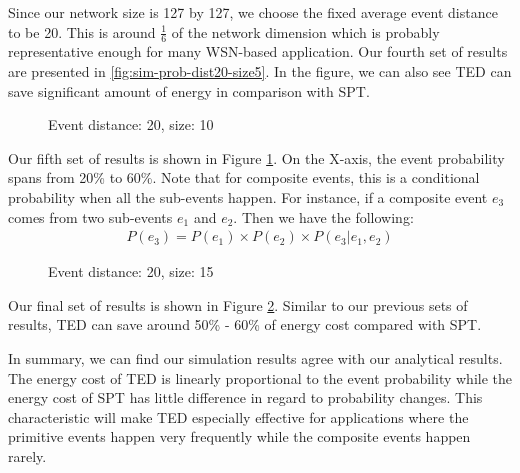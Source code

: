 Since our network size is 127 by 127, we choose the fixed average event distance to be 20. This is around \(\frac{1}{6}\) of the network dimension which is probably representative enough for many WSN-based application. Our fourth set of results are presented in \ref{fig:sim-prob-dist20-size5}. In the figure, we can also see TED can save significant amount of energy in comparison with SPT.

\begin{figure}
\centering
{}
\caption{Event distance: 20, size: 10}
\label{fig:sim-prob-dist20-size10}
\end{figure}

Our fifth set of results is shown in Figure \ref{fig:sim-prob-dist20-size10}. On the X-axis, the event probability spans from 20\% to 60\%. Note that for composite events, this is a conditional probability when all the sub-events happen. For instance, if a composite event \(e_3\) comes from two sub-events \(e_1\) and \(e_2\). Then we have the following:
\begin{align*}
P(e_3) = P(e_1) \times P(e_2) \times P(e_3|e_1, e_2)
\end{align*}

\begin{figure}
\centering
{}
\caption{Event distance: 20, size: 15}
\label{fig:sim-prob-dist20-size15}
\end{figure}

Our final set of results is shown in Figure \ref{fig:sim-prob-dist20-size15}. Similar to our previous sets of results, TED can save around 50\% - 60\% of energy cost compared with SPT.

In summary, we can find our simulation results agree with our analytical results. The energy cost of TED is linearly proportional to the event probability while the energy cost of SPT has little difference in regard to probability changes. This characteristic will make TED especially effective for applications where the primitive events happen very frequently while the composite events happen rarely.